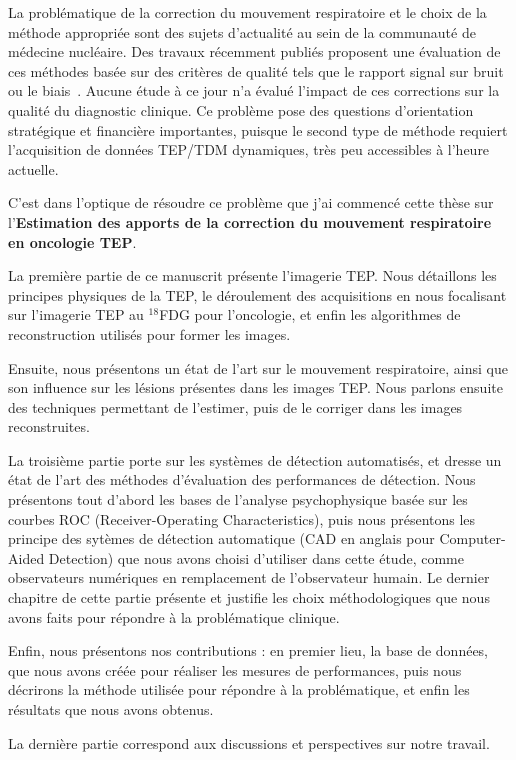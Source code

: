 La problématique de la correction du mouvement respiratoire et le choix de la méthode appropriée sont des sujets d’actualité au sein de la communauté de médecine nucléaire. Des travaux récemment publiés proposent une évaluation de ces méthodes basée sur des critères de qualité tels que le rapport signal sur bruit ou le biais~\cite{visvikis2004evaluation}. Aucune étude à ce jour n’a évalué l’impact de ces corrections sur la qualité du diagnostic clinique. Ce problème pose des questions d’orientation stratégique et financière importantes, puisque le second type de méthode requiert l’acquisition de données TEP/TDM dynamiques, très peu accessibles à l’heure actuelle.

C'est dans l'optique de résoudre ce problème que j'ai commencé cette thèse sur l'\textbf{Estimation des apports de la correction du mouvement respiratoire en oncologie TEP}.


La première partie de ce manuscrit présente l'imagerie TEP. Nous détaillons les principes physiques de la TEP, le déroulement des acquisitions en nous focalisant sur l'imagerie TEP au $^18$FDG pour l'oncologie, et enfin les algorithmes de reconstruction utilisés pour former les images.

Ensuite, nous présentons un état de l'art sur le mouvement respiratoire, ainsi que son influence sur les lésions présentes dans les images TEP. Nous parlons ensuite des techniques permettant de l'estimer, puis de le corriger dans les images reconstruites.

La troisième partie porte sur les systèmes de détection automatisés, et dresse un état de l'art des méthodes d'évaluation des performances de détection. Nous présentons tout d'abord les bases de l'analyse psychophysique basée sur les courbes ROC (Receiver-Operating Characteristics), puis nous présentons les principe des sytèmes de détection automatique (CAD en anglais pour Computer-Aided Detection) que nous avons choisi d'utiliser dans cette étude, comme observateurs numériques en remplacement de l'observateur humain. Le dernier chapitre de cette partie présente et justifie les choix méthodologiques que nous avons faits pour répondre à la problématique clinique.

Enfin, nous présentons nos contributions : en premier lieu, la base de données, que nous avons créée pour réaliser les mesures de performances, puis nous décrirons la méthode utilisée pour répondre à la problématique, et enfin les résultats que nous avons obtenus.

La dernière partie correspond aux discussions et perspectives sur notre travail.